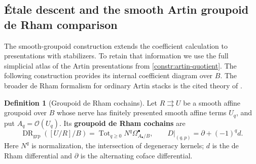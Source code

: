 \documentclass[11pt,a4paper]{article}
\numberwithin{algorithm}{section}
\numberwithin{equation}{section}
\theoremstyle{definition}
\newtheorem{definition}[definition]{Definition}
\theoremstyle{remark}
\theoremstyle{plain}
\newcommand{\OO}{\mathcal O}
\theoremstyle{definition}
\theoremstyle{plain}
\begin{document}
\subsection{\'Etale descent and the smooth Artin groupoid de Rham comparison}
\label{sec:artin-derham}
The smooth-groupoid construction extends the coefficient calculation
to presentations with stabilizers. To retain that information
we use the full simplicial atlas of the Artin presentations
from \cref{constr:artin-quotient}. The following construction
provides its internal coefficient diagram over $B$.
The broader de Rham formalism for ordinary Artin stacks is
the cited theory of \citep{BehrendDR,StacksArtin}.

\begin{definition}[Groupoid de Rham cochains]\label{def:groupoid-derham-cochains}
Let $R\rightrightarrows U$ be a smooth affine groupoid over $B$
whose nerve has finitely presented smooth affine terms $U_q$, and
put $A_q=\OO(U_q)$. Its \textbf{groupoid de Rham cochains} are
\[
 \operatorname{DR}_{\mathrm{grp}}([U/R]/B)
 =\operatorname{Tot}_{q\ge0}N^q\Omega^\bullet_{A_\bullet/B},
 \qquad D|_{(q,p)}=\partial+(-1)^q d.
\]
Here $N^q$ is normalization, the intersection of degeneracy kernels;
$d$ is the de Rham differential and $\partial$ is the alternating
coface differential.
\end{definition}
\end{document}
